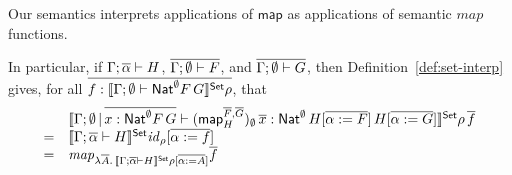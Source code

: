 \documentclass[runningheads]{llncs}
\renewcommand{\id}{\mathit{id}}
\newcommand{\map}{\mathsf{map}}
\renewcommand{\id}{\mathit{id}}
\begin{document}
Our semantics interprets applications of $\map$ as applications of
semantic $\mathit{map}$ functions.
\begin{comment}
Indeed, if \(\Gamma; \ol{\phi},
\ol{\gamma} \vdash H\), \(\ol{\Gamma; \emptyset, \ol{\gamma} \vdash
  F}\), and \(\ol{\Gamma; \Phi, \emptyset, \ol{\gamma} \vdash G}\),
then 
Definition~\ref{def:set-interp} gives
\begin{align}
& \setsem{
\Gamma;\Phi \,|\, \Delta
\vdash \map^{\ol{F},\ol{G}}_H \,\ol t
: %
\Nat^{\ol{\gamma}}\,H[\ol{\phi :=_{\ol{\beta}} F}]\,H[\ol{\phi :=_{\ol{\beta}} G}]
} \rho \nonumber \\ 
=\;\; & \lambda d\, \ol{\eta}\,\ol{B}.\,
\setsem{\Gamma; \ol{\phi},\ol{\gamma}\vdash H}
\id_{\rho[\ol{\gamma := B}]}[\ol{\phi := \lambda
    \ol{A}.\eta_{\ol{A}\,\ol{B}}}] \label{eq:map-sem-def}
\end{align}
\end{comment}
In particular, if $\Gamma; \overline{\alpha} \vdash H$, $\overline{\Gamma;
  \emptyset \vdash F}$, and $\overline{\Gamma; \emptyset \vdash G}$, then
Definition~\ref{def:set-interp} gives, for all $\overline{f :
  \llbracket{\Gamma;\emptyset \vdash \mathsf{Nat}^\emptyset F\,G}\rrbracket^{\mathsf{Set}}\rho}$, that
\[\begin{array}{rl}
&\setsem{ \Gamma;\emptyset\,|\,\ol{x : \Nat^\emptyset F \, G}
  \vdash (\map^{\ol{F},\ol{G}}_H)_\emptyset\,\ol x :
  \Nat^{\emptyset}\,H[\ol{\alpha := F}]\,H[\ol{\alpha := G}]}
\rho\,\ol f\\ =& \setsem{\Gamma; \ol{\alpha}\vdash H}
\id_{\rho}[\ol{\alpha := f}] \\ =&
\mathit{map}_{\lambda \ol{A}.\,\setsem{\Gamma; \ol{\alpha}\vdash H} \rho [\ol{\alpha := A}]} \ol{f} \\
\end{array}
\]
\end{document}
